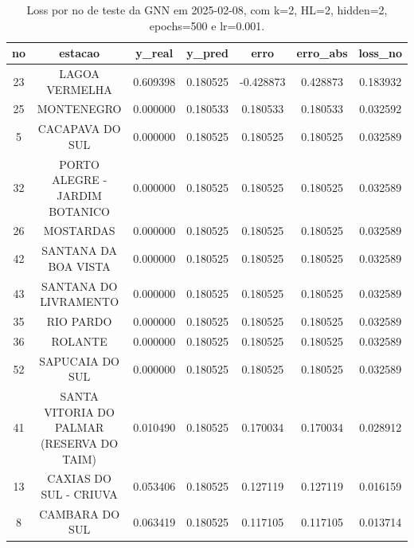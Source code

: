 \begin{table}[h]
\centering
\caption{Loss por no de teste da GNN em 2025-02-08, com k=2, HL=2, hidden=2, epochs=500 e lr=0.001.}
\label{tab:gnn_loss_k2_hl2_h2_e500_d20250208}
\begin{tabular}{ccccccc}
\toprule
no & estacao & y\_real & y\_pred & erro & erro\_abs & loss\_no \\
\midrule
23 & LAGOA VERMELHA & 0.609398 & 0.180525 & -0.428873 & 0.428873 & 0.183932 \\
25 & MONTENEGRO & 0.000000 & 0.180533 & 0.180533 & 0.180533 & 0.032592 \\
5 & CACAPAVA DO SUL & 0.000000 & 0.180525 & 0.180525 & 0.180525 & 0.032589 \\
32 & PORTO ALEGRE - JARDIM BOTANICO & 0.000000 & 0.180525 & 0.180525 & 0.180525 & 0.032589 \\
26 & MOSTARDAS & 0.000000 & 0.180525 & 0.180525 & 0.180525 & 0.032589 \\
42 & SANTANA DA BOA VISTA & 0.000000 & 0.180525 & 0.180525 & 0.180525 & 0.032589 \\
43 & SANTANA DO LIVRAMENTO & 0.000000 & 0.180525 & 0.180525 & 0.180525 & 0.032589 \\
35 & RIO PARDO & 0.000000 & 0.180525 & 0.180525 & 0.180525 & 0.032589 \\
36 & ROLANTE & 0.000000 & 0.180525 & 0.180525 & 0.180525 & 0.032589 \\
52 & SAPUCAIA DO SUL & 0.000000 & 0.180525 & 0.180525 & 0.180525 & 0.032589 \\
41 & SANTA VITORIA DO PALMAR (RESERVA DO TAIM) & 0.010490 & 0.180525 & 0.170034 & 0.170034 & 0.028912 \\
13 & CAXIAS DO SUL - CRIUVA & 0.053406 & 0.180525 & 0.127119 & 0.127119 & 0.016159 \\
8 & CAMBARA DO SUL & 0.063419 & 0.180525 & 0.117105 & 0.117105 & 0.013714 \\
\bottomrule
\end{tabular}
\end{table}
